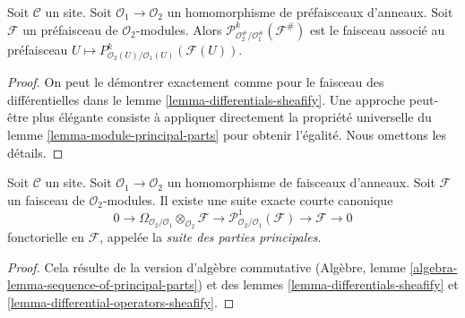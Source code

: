 \begin{lemma}
\label{lemma-differential-operators-sheafify}
Soit $\mathcal{C}$ un site. Soit $\mathcal{O}_1 \to \mathcal{O}_2$
un homomorphisme de préfaisceaux d'anneaux. Soit $\mathcal{F}$ un préfaisceau
de $\mathcal{O}_2$-modules. Alors
$\mathcal{P}^k_{\mathcal{O}_2^\#/\mathcal{O}_1^\#}(\mathcal{F}^\#)$
est le faisceau associé au préfaisceau
$U \mapsto P^k_{\mathcal{O}_2(U)/\mathcal{O}_1(U)}(\mathcal{F}(U))$.
\end{lemma}

\begin{proof}
On peut le démontrer exactement comme pour le faisceau des différentielles
dans le lemme \ref{lemma-differentials-sheafify}.
Une approche peut-être plus élégante consiste à appliquer directement la
propriété universelle du lemme \ref{lemma-module-principal-parts} pour obtenir
l'égalité. Nous omettons les détails.
\end{proof}

\begin{lemma}
\label{lemma-sequence-of-principal-parts}
Soit $\mathcal{C}$ un site. Soit $\mathcal{O}_1 \to \mathcal{O}_2$
un homomorphisme de faisceaux d'anneaux. Soit $\mathcal{F}$ un faisceau
de $\mathcal{O}_2$-modules. Il existe une suite exacte courte canonique
$$
0 \to
\Omega_{\mathcal{O}_2/\mathcal{O}_1} \otimes_{\mathcal{O}_2} \mathcal{F} \to
\mathcal{P}^1_{\mathcal{O}_2/\mathcal{O}_1}(\mathcal{F}) \to
\mathcal{F} \to 0
$$
fonctorielle en $\mathcal{F}$, appelée la {\it suite des parties principales}.
\end{lemma}

\begin{proof}
Cela résulte de la version d'algèbre commutative
(Algèbre, lemme \ref{algebra-lemma-sequence-of-principal-parts})
et des lemmes \ref{lemma-differentials-sheafify} et
\ref{lemma-differential-operators-sheafify}.
\end{proof}

